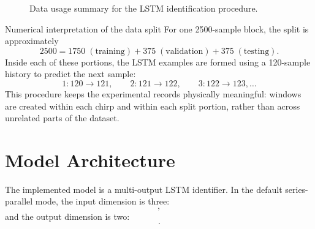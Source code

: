 \documentclass[11pt]{article}
\begin{document}
\begin{figure}[H]
{%
}
\caption{Data usage summary for the LSTM identification procedure.}
\label{fig:data_usage_summary}
\end{figure}

\begin{databox}{Numerical interpretation of the data split}
For one 2500-sample block, the split is approximately
\begin{equation}
2500 = 1750\; (\text{training}) + 375\; (\text{validation}) + 375\; (\text{testing}).
\end{equation}
Inside each of these portions, the LSTM examples are formed using a 120-sample history to predict the next sample:
\begin{equation}
1{:}120\rightarrow121,\qquad 2{:}121\rightarrow122,\qquad 3{:}122\rightarrow123,\ldots
\end{equation}
This procedure keeps the experimental records physically meaningful: windows are created within each chirp and within each split portion, rather than across unrelated parts of the dataset.
\end{databox}

\section{Model Architecture}
The implemented model is a multi-output LSTM identifier. In the default series-parallel mode, the input dimension is three:
\begin{equation}
[I(k),x(k),F(k)],
\end{equation}
and the output dimension is two:
\begin{equation}
[\hat{x}(k+1),\hat{F}(k+1)].
\end{equation}
\end{document}
